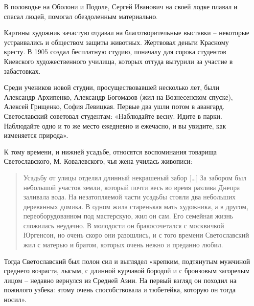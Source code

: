 В половодье на Оболони и Подоле, Сергей Иванович на своей лодке плавал и спасал людей, помогал обездоленным материально.

Картины художник зачастую отдавал на благотворительные выставки – некоторые устраивались и обществом защиты животных. Жертвовал деньги Красному кресту. В 1905 создал бесплатную студию, поначалу для сорока студентов Киевского художественного училища, которых оттуда вытурили за участие в забастовках.

Среди учеников новой студии, просуществовавшей несколько лет, были Александр Архипенко, Александр Богомазов (жил на Вознесенском спуске), Алексей Грищенко, София Левицкая. Первые два ушли потом в авангард. Светославский советовал студентам: «Наблюдайте весну. Идите в парки. Наблюдайте одно и то же место ежедневно и ежечасно, и вы увидите, как изменяется природа».

К тому времени, и нижней усадьбе, относятся воспоминания товарища Светославского, М. Ковалевского, чья жена училась живописи:

\begin{quotation}
Усадьбу от улицы отделял длинный некрашеный забор […] За забором был небольшой участок земли, который почти весь во время разлива Днепра заливала вода. На незатопляемой части усадьбы стояли два небольших деревянных домика. В одном жила старенькая мать художника, а в другом, переоборудованном под мастерскую, жил он сам. Его семейная жизнь сложилась неудачно. В молодости он бракосочетался с москвичкой Юргенсон, но очень скоро они разошлись, и с того времени Светославский жил с матерью и братом, которых очень нежно и преданно любил.
\end{quotation}

Тогда Светославский был полон сил и выглядел «крепким, подтянутым мужчиной среднего возраста, лысым, с длинной курчавой бородой и с бронзовым загорелым лицом – недавно вернулся из Средней Азии. На первый взгляд он походил на пожилого узбека: этому очень способствовала и тюбетейка, которую он тогда носил».

\vspace*{\fill}


